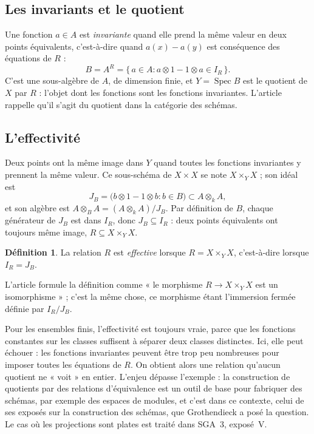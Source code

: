 \documentclass[11pt,a4paper]{amsart}
\theoremstyle{definition}
\newtheorem{definition}{Définition}
\theoremstyle{plain}
\theoremstyle{remark}
\newcommand{\Spec}{\operatorname{Spec}}
\begin{document}
\subsection{Les invariants et le quotient}

Une fonction $a \in A$ est \emph{invariante} quand elle prend la même valeur en deux points équivalents, c'est-à-dire quand $a(x) - a(y)$ est conséquence des équations de $R$ :
\[
B = A^R = \{\, a \in A : a \otimes 1 - 1 \otimes a \in I_R \,\}.
\]
C'est une sous-algèbre de $A$, de dimension finie, et $Y = \Spec B$ est le quotient de $X$ par $R$ : l'objet dont les fonctions sont les fonctions invariantes. L'article rappelle qu'il s'agit du quotient dans la catégorie des schémas.

\subsection{L'effectivité}

Deux points ont la même image dans $Y$ quand toutes les fonctions invariantes y prennent la même valeur. Ce sous-schéma de $X \times X$ se note $X \times_Y X$ ; son idéal est
\[
J_B = \bigl(b \otimes 1 - 1 \otimes b : b \in B\bigr) \subset A \otimes_k A,
\]
et son algèbre est $A \otimes_B A = (A \otimes_k A)/J_B$. Par définition de $B$, chaque générateur de $J_B$ est dans $I_R$, donc $J_B \subseteq I_R$ : deux points équivalents ont toujours même image, $R \subseteq X \times_Y X$.

\begin{definition}
La relation $R$ est \emph{effective} lorsque $R = X \times_Y X$, c'est-à-dire lorsque $I_R = J_B$.
\end{definition}

L'article formule la définition comme « le morphisme $R \to X \times_Y X$ est un isomorphisme » ; c'est la même chose, ce morphisme étant l'immersion fermée définie par $I_R/J_B$.

Pour les ensembles finis, l'effectivité est toujours vraie, parce que les fonctions constantes sur les classes suffisent à séparer deux classes distinctes. Ici, elle peut échouer : les fonctions invariantes peuvent être trop peu nombreuses pour imposer toutes les équations de $R$. On obtient alors une relation qu'aucun quotient ne « voit » en entier. L'enjeu dépasse l'exemple : la construction de quotients par des relations d'équivalence est un outil de base pour fabriquer des schémas, par exemple des espaces de modules, et c'est dans ce contexte, celui de ses exposés sur la construction des schémas, que Grothendieck a posé la question. Le cas où les projections sont plates est traité dans SGA~3, exposé~V.
\end{document}
